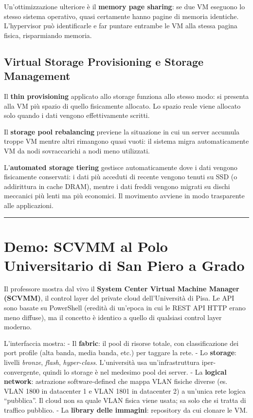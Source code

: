 \documentclass[
  italian,
  openany]{book}
\begin{document}
Un'ottimizzazione ulteriore è il \textbf{memory page sharing}: se due VM
eseguono lo stesso sistema operativo, quasi certamente hanno pagine di
memoria identiche. L'hypervisor può identificarle e far puntare entrambe
le VM alla stessa pagina fisica, risparmiando memoria.

\subsection{Virtual Storage Provisioning e Storage
Management}\label{virtual-storage-provisioning-e-storage-management}

Il \textbf{thin provisioning} applicato allo storage funziona allo
stesso modo: si presenta alla VM più spazio di quello fisicamente
allocato. Lo spazio reale viene allocato solo quando i dati vengono
effettivamente scritti.

Il \textbf{storage pool rebalancing} previene la situazione in cui un
server accumula troppe VM mentre altri rimangono quasi vuoti: il sistema
migra automaticamente VM da nodi sovraccarichi a nodi meno utilizzati.

L'\textbf{automated storage tiering} gestisce automaticamente dove i
dati vengono fisicamente conservati: i dati più acceduti di recente
vengono tenuti su SSD (o addirittura in cache DRAM), mentre i dati
freddi vengono migrati su dischi meccanici più lenti ma più economici.
Il movimento avviene in modo trasparente alle applicazioni.

\begin{center}\rule{0.5\linewidth}{0.5pt}\end{center}

\section{Demo: SCVMM al Polo Universitario di San Piero a
Grado}\label{demo-scvmm-al-polo-universitario-di-san-piero-a-grado}

Il professore mostra dal vivo il \textbf{System Center Virtual Machine
Manager (SCVMM)}, il control layer del private cloud dell'Università di
Pisa. Le API sono basate su PowerShell (eredità di un'epoca in cui le
REST API HTTP erano meno diffuse), ma il concetto è identico a quello di
qualsiasi control layer moderno.

L'interfaccia mostra: - Il \textbf{fabric}: il pool di risorse totale,
con classificazione dei port profile (alta banda, media banda, etc.) per
taggare la rete. - Lo \textbf{storage}: livelli \emph{bronze},
\emph{flash}, \emph{hyper-class}. L'università usa un'infrastruttura
iper-convergente, quindi lo storage è nel medesimo pool dei server. - La
\textbf{logical network}: astrazione software-defined che mappa VLAN
fisiche diverse (es. VLAN 1800 in datacenter 1 e VLAN 1801 in datacenter
2) a un'unica rete logica ``pubblica''. Il cloud non sa quale VLAN
fisica viene usata; sa solo che si tratta di traffico pubblico. - La
\textbf{library delle immagini}: repository da cui clonare le VM.
\end{document}
